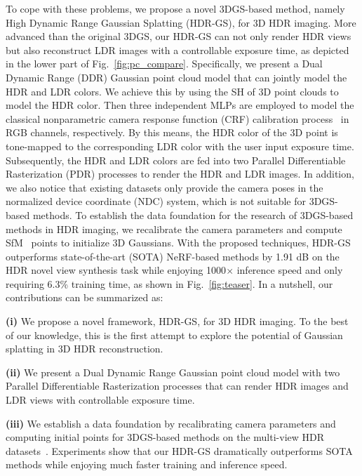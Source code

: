\documentclass{article}
\begin{document}
To cope with these problems, we propose a novel 3DGS-based method, namely High Dynamic Range Gaussian Splatting (HDR-GS), for 3D HDR imaging. More advanced than the original 3DGS, our HDR-GS can not only render HDR views but also reconstruct LDR images with a controllable exposure time, as depicted in the lower part of Fig.~\ref{fig:pc_compare}. Specifically, we present a Dual Dynamic Range (DDR) Gaussian point cloud model that can jointly model the HDR and LDR colors. We achieve this by using the SH of 3D point clouds to model the HDR color. Then three independent MLPs are employed to model the classical nonparametric camera response function (CRF) calibration process~\cite{malik} in RGB channels, respectively. By this means, the HDR color of the 3D point is tone-mapped to the corresponding LDR color with the user input exposure time. Subsequently, the HDR and LDR colors are fed into two Parallel Differentiable Rasterization (PDR) processes to render the HDR and LDR images. In addition, we also notice that existing datasets only provide the camera poses in the normalized device coordinate (NDC) system, which is not suitable for 3DGS-based methods. To establish the data foundation for the research of 3DGS-based methods in HDR imaging, we recalibrate the camera parameters and compute SfM~\cite{sfm} points to initialize 3D Gaussians.   With the proposed techniques, HDR-GS outperforms state-of-the-art (SOTA) NeRF-based methods by 1.91 dB on the HDR novel view synthesis task while enjoying 1000$\times$ inference speed and only requiring 6.3\% training time, as shown in Fig.~\ref{fig:teaser}. In a nutshell, our contributions can be summarized as:






\textbf{(i)} We propose a novel framework, HDR-GS, for 3D HDR imaging. To the best of our knowledge, this is the first attempt to explore the potential of Gaussian splatting in 3D HDR reconstruction.

\textbf{(ii)} We present a Dual Dynamic Range Gaussian point cloud model with two Parallel Differentiable Rasterization processes that can render HDR images and LDR views with controllable exposure time.

\textbf{(iii)} We establish a data foundation by recalibrating camera parameters and computing initial points for 3DGS-based methods on the multi-view HDR datasets~\cite{hdr_nerf}. Experiments show that our HDR-GS dramatically outperforms SOTA methods while enjoying much faster training and inference speed. %
\end{document}
